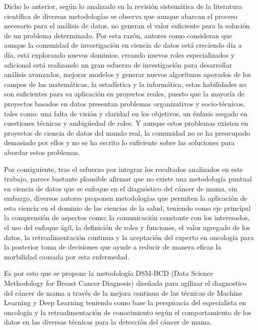 Dicho lo anterior, según lo analizado en la revisión sistemática de la literatura científica de diversas metodologías se observa que aunque abarcan el proceso necesario para el análisis de datos, no generan el valor suficiente para la solución de un problema determinado. Por esta razón, autores como \cite{Martinez2021} consideran que aunque la comunidad de investigación en ciencia de datos está creciendo día a día, está explorando nuevos dominios, creando nuevos roles especializados y adicional está realizando un gran esfuerzo de investigación para desarrollar análisis avanzados, mejorar modelos y generar nuevos algoritmos apoyados de los campos de las matemáticas, la estadística y la informática, estas habilidades no son suficientes para su aplicación en proyectos reales, puesto que la mayoría de proyectos basados en datos presentan problemas organizativos y socio-técnicos, tales como: una falta de visión y claridad en los objetivos, un énfasis sesgado en cuestiones técnicas y ambigüedad de roles. Y aunque estos problemas existen en proyectos de ciencia de datos del mundo real, la comunidad no se ha preocupado demasiado por ellos y no se ha escrito lo suficiente sobre las soluciones para abordar estos problemas.

\newpage
Por consiguiente, tras el esfuerzo por integrar los resultados analizados en este trabajo, parece bastante plausible afirmar que no existe una metodología puntual en ciencia de datos que se enfoque en el diagnóstico del cáncer de mama, sin embargo, diversos autores proponen metodologías que permiten la aplicación de esta ciencia en el dominio de las ciencias de la salud, teniendo como eje principal la comprensión de aspectos como: la comunicación constante con los interesados, el uso del enfoque ágil, la definición de roles y funciones, el valor agregado de los datos, la retroalimentación continua y la aceptación del experto en oncología para la posterior toma de decisiones que ayude a reducir de manera eficaz la morbilidad causada por esta enfermedad. 

Es por esto que se propone la metodología DSM-BCD (Data Science Methodology for Breast Cancer Diagnosis) diseñada para agilizar el diagnostico del cáncer de mama a través de la mejora continua de las técnicas de Machine Learning y Deep Learning teniendo como base la perspicacia del especialista en oncología y la retroalimentación  de conocimiento según el comportamiento de los datos en las diversas técnicas para la detección del cáncer de mama.